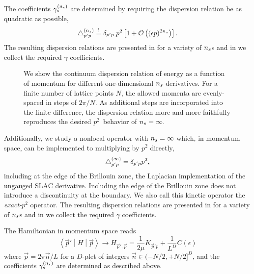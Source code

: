The coefficients $\gamma_{s}^{({n_s})}$ are determined by requiring the dispersion relation be as quadratic as possible,
\begin{equation}
    \label{eq:gamma determination}
    \mathop{}\!\mathbin\bigtriangleup^{({n_s})}_{p'p}
    \overset{!}{=}
    \delta_{p'p} \;
    p^2 \left[
        1 + \mathcal{O}\left((\epsilon p)^{2{n_s}}\right)
    \right].
\end{equation}
The resulting dispersion relations are presented in  for a variety of ${n_s}$s and in  we collect the required $\gamma$ coefficients.

\begin{figure}
    
    \caption{We show the continuum dispersion relation of energy as a function of momentum for different one-dimensional ${n_s}$ derivatives.  For a finite number of lattice points $N$, the allowed momenta are evenly-spaced in steps of $2\pi/N$.
    As additional steps are incorporated into the finite difference, the dispersion relation more and more faithfully reproduces the desired $p^2$~behavior of ${n_s}=\infty$.
    }
    \label{fig:dispersion relation}
\end{figure}

Additionally, we study a nonlocal operator with ${n_s}=\infty$ which, in momentum space, can be implemented to multiplying by $p^2$ directly,
\begin{equation}
    \mathop{}\!\mathbin\bigtriangleup^{(\infty)}_{p'p}
    =
    \delta_{p'p} p^2,
\end{equation}
including at the edge of the Brillouin zone, the Laplacian implementation of the ungauged SLAC derivative.
Including the edge of the Brillouin zone does not introduce a discontinuity at the boundary.
We also call this kinetic operator the \emph{exact-$p^2$} operator.
The resulting dispersion relations are presented in  for a variety of ${n_s}$s and
in  we collect the required $\gamma$ coefficients.

The Hamiltonian in momentum space reads
\begin{equation}
    \label{eq:p space hamiltonian}
    \left\langle \vec{p}' \middle| H \middle| \vec{p} \right\rangle
    \rightarrow
    H_{\vec{p}',\vec{p}}
    =
    \frac{1}{2\mu} K_{\vec{p}'p}
    +\frac{1}{L^D}C(\epsilon)
\end{equation}
where $\vec{p} = 2\pi \vec{n}/L$ for a $D$-plet of integers $\vec{n} \in (-N/2, +N/2]^D$, and the coefficients $\gamma_{s}^{({n_s})}$ are determined as described above.


